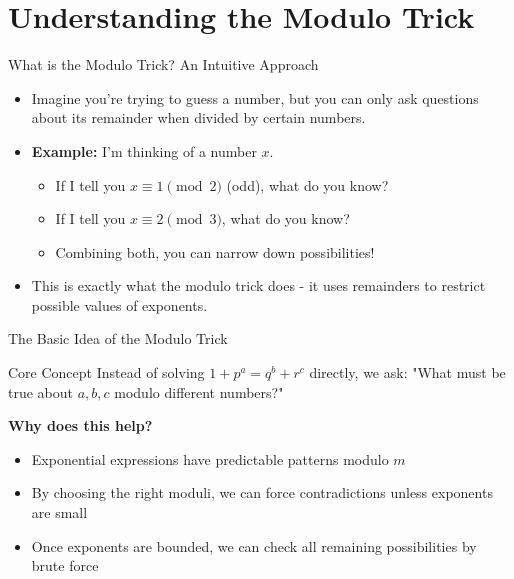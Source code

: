 ﻿\documentclass[10pt,aspectratio=169]{beamer}
\begin{document}
\section{Understanding the Modulo Trick}

\begin{frame}{What is the Modulo Trick? An Intuitive Approach}
    \begin{itemize}
        \item Imagine you're trying to guess a number, but you can only ask questions about its remainder when divided by certain numbers.
        \item \textbf{Example:} I'm thinking of a number $x$. 
        \begin{itemize}
            \item If I tell you $x \equiv 1 \pmod 2$ (odd), what do you know?
            \item If I tell you $x \equiv 2 \pmod 3$, what do you know?
            \item Combining both, you can narrow down possibilities!
        \end{itemize}
        \item This is exactly what the modulo trick does - it uses remainders to restrict possible values of exponents.
    \end{itemize}
\end{frame}

\begin{frame}{The Basic Idea of the Modulo Trick}
    \begin{block}{Core Concept}
        Instead of solving $1+p^a = q^b + r^c$ directly, we ask:
        "What must be true about $a,b,c$ modulo different numbers?"
    \end{block}
    
    \vspace{0.3cm}
    \textbf{Why does this help?}
    \begin{itemize}
        \item Exponential expressions have predictable patterns modulo $m$
        \item By choosing the right moduli, we can force contradictions unless exponents are small
        \item Once exponents are bounded, we can check all remaining possibilities by brute force
    \end{itemize}
\end{frame}
\end{document}
